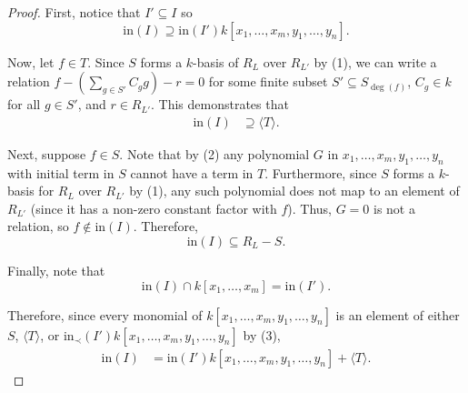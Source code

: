 \documentclass{amsart}
\theoremstyle{plain}
\theoremstyle{definition}
\theoremstyle{remark}
\numberwithin{equation}{section}
\newcommand \halfcan{L}
\newcommand \initial{\text{in}}
\begin{document}
\begin{proof}
First, notice that $I'\subseteq I$ so 
\[
	\initial(I)\supseteq \initial(I')k[x_1, \ldots, x_m, y_1, \ldots, y_n].
\]

Now, let $f\in T$.  Since $S$ forms a $k$-basis of $R_{\halfcan}$ over $R_{\halfcan'}$ by (1), we can write a relation $f - (\sum_{g\in S'} C_g g)-r=0$ for some finite subset $S'\subseteq S_{\deg(f)}$, $C_g\in k$ for all $g\in S'$, and $r\in R_{\halfcan'}$.  This demonstrates that 
\begin{align*}
	\initial(I) & \supseteq \langle T \rangle.
\end{align*}

Next, suppose $f\in S$.  Note that by (2) any polynomial $G$ in $x_1,\ldots, x_m, y_1, \ldots, y_n$ with initial term in $S$ cannot have a term in $T$.  Furthermore, since $S$ forms a $k$-basis for $R_\halfcan$ over $R_{\halfcan'}$ by (1), any such polynomial does not map to an element of $R_{\halfcan'}$ (since it has a non-zero constant factor with $f$).  Thus, $G=0$ is not a relation, so $f\not\in \initial(I)$.  Therefore, 
\[
	\initial(I)\subseteq R_\halfcan-S.
\]

Finally, note that
\[
	\initial(I) \cap k[x_1, \ldots, x_m] = \initial(I').
\]

Therefore, since every monomial of $k[x_1, \ldots, x_m, y_1, \ldots, y_n]$ is an element of either $S$, $\langle T\rangle$, or $\initial_\prec(I') k[x_1, \ldots, x_m, y_1, \ldots, y_n]$ by (3),
\begin{align*}
	\initial(I) & = \initial(I') k[x_1, \ldots, x_m, y_1, \ldots, y_n] + \langle T \rangle.
\end{align*}
\end{proof}
\end{document}
